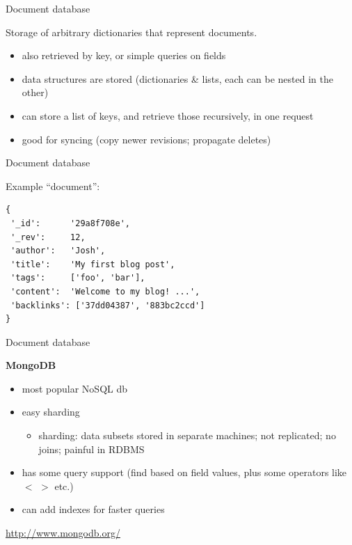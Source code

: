 \documentclass{beamer}
\begin{document}
\begin{frame}{Document database}

  Storage of arbitrary dictionaries that represent documents.

  \begin{itemize}
  \item also retrieved by key, or simple queries on fields
  \item data structures are stored (dictionaries \& lists, each can be nested in the other)
  \item can store a list of keys, and retrieve those recursively, in one request
  \item good for syncing (copy newer revisions; propagate deletes)
  \end{itemize}

\end{frame}

\begin{frame}[fragile]{Document database}

  Example ``document'':

\begin{verbatim}
{
 '_id':      '29a8f708e',
 '_rev':     12,
 'author':   'Josh',
 'title':    'My first blog post',
 'tags':     ['foo', 'bar'],
 'content':  'Welcome to my blog! ...',
 'backlinks': ['37dd04387', '883bc2ccd']
}
\end{verbatim}

\end{frame}

\begin{frame}{Document database}

  \textbf{MongoDB}

  \vskip 0.15in

  \begin{itemize}
  \item most popular NoSQL db
  \item easy sharding
    \begin{itemize}
    \item sharding: data subsets stored in separate machines; not
      replicated; no joins; painful in RDBMS
    \end{itemize}
  \item has some query support (find based on field values, plus some
    operators like $<$ $>$ etc.)
  \item can add indexes for faster queries
  \end{itemize}

  \vskip 0.15in
  
  \url{http://www.mongodb.org/}

\end{frame}
\end{document}
